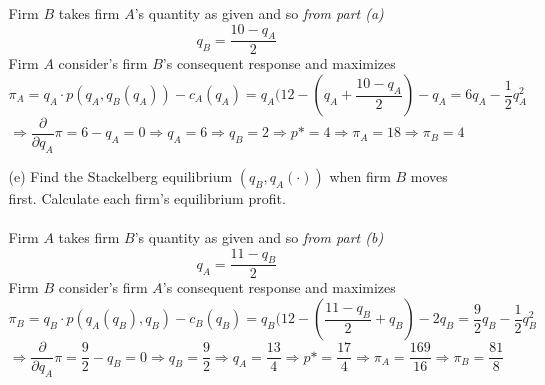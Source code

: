 \documentclass[11pt]{article}
\begin{document}
\begin{enumerate}
\begin{itemize}
	Firm $B$ takes firm $A$'s quantity as given and so \emph{from part (a)}
	$$q_B=\dfrac{10-q_A}{2}$$
	Firm $A$ consider's firm $B$'s consequent response and maximizes
	$$\pi_A=q_A\cdot p(q_A,q_B(q_A))-c_A(q_A)=q_A(12-(q_A+\dfrac{10-q_A}{2})-q_A=6q_A-\dfrac{1}{2}q_A^2$$
	$$\Rightarrow\dfrac{\partial}{\partial q_A}\pi=6-q_A=0\Rightarrow q_A=6\Rightarrow q_B=2\Rightarrow p*=4\Rightarrow\pi_A=18\Rightarrow\pi_B=4$$
	\item[(e)] Find the Stackelberg equilibrium $(q_{B},q_{A}(\cdot))$ when firm $B$ moves first. Calculate each firm's equilibrium profit.
	\smallskip\\\\
	Firm $A$ takes firm $B$'s quantity as given and so \emph{from part (b)}
	$$q_A=\dfrac{11-q_B}{2}$$
	Firm $B$ consider's firm $A$'s consequent response and maximizes
	$$\pi_B=q_B\cdot p(q_A(q_B),q_B)-c_B(q_B)=q_B(12-(\dfrac{11-q_B}{2}+q_B)-2q_B=\dfrac{9}{2}q_B-\dfrac{1}{2}q_B^2$$
	$$\Rightarrow\dfrac{\partial}{\partial q_A}\pi=\dfrac{9}{2}-q_B=0\Rightarrow q_B=\dfrac{9}{2}\Rightarrow q_A=\dfrac{13}{4}\Rightarrow p*=\dfrac{17}{4}\Rightarrow\pi_A=\dfrac{169}{16}\Rightarrow\pi_B=\dfrac{81}{8}$$
	\end{itemize}
\end{enumerate}
\end{document}
